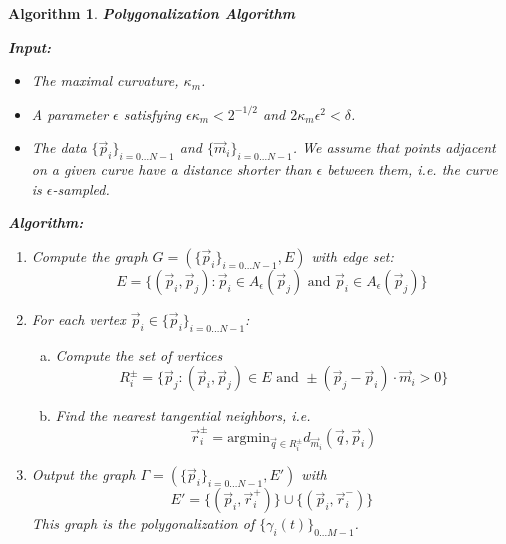 \documentclass{article}
\newtheorem{algo}{Algorithm}
\numberwithin{cntr}{section}
\numberwithin{equation}{section}
\newcommand{\vp}[0]{{\vec{p}}}
\newcommand{\vq}[0]{{\vec{q}}}
\newcommand{\vr}[0]{{\vec{r}}}
\newcommand{\vm}[0]{{\vec{m}}}
\newcommand{\Oto}[1]{{0 \ldots #1-1}}
\newcommand{\OtoN}{{0 \ldots N-1}}
\newcommand{\pointData}{{ \{ \vp_{i} \}_{i=\OtoN} }}
\newcommand{\tanData}{{ \{ \vm_{i} \}_{i=\OtoN} }}
\newcommand{\curveSet}{{ \{ \gamma_i(t) \}_{\Oto{M}}}}
\newcommand{\allowed}[2]{ { A_{#1}(#2) } }
\newcommand{\curvemax}{{\kappa_{m}}}
\newcommand{\curvesep}{{\delta}}
\begin{document}
\begin{algo}
  \label{algo:polygonalization}
  {\bf Polygonalization Algorithm }

  { \bf Input: }

  \begin{itemize}
  \item The maximal curvature, $\curvemax$.
  \item A parameter $\epsilon$ satisfying $\epsilon \curvemax < 2^{-1/2}$ and $2 \curvemax \epsilon^{2} < \curvesep$.
  \item The data $\pointData$ and $\tanData$. We assume that points adjacent on a given curve have a distance shorter than $\epsilon$ between them, i.e. the curve is $\epsilon$-sampled.
  \end{itemize}


  {\bf Algorithm: }

  \begin{enumerate}
  \item Compute the graph $G = (\pointData, E)$ with edge set:
    \begin{equation*}
      E = \{ (\vp_{i},\vp_{j}) : \vp_{i} \in \allowed{\epsilon}{\vp_{j}} \textrm{~and~} \vp_{i} \in \allowed{\epsilon}{\vp_{j}}\}
    \end{equation*}
  \item For each vertex $\vp_{i} \in \pointData$:
    \begin{enumerate}[a.]
    \item Compute the set of vertices
      \begin{equation*}
        R^{\pm}_{i} = \{ \vp_{j} : (\vp_{i}, \vp_{j}) \in E \textrm{~and~} \pm (\vp_{j}-\vp_{i}) \cdot \vm_{i} > 0 \}
      \end{equation*}
    \item Find the nearest tangential neighbors, i.e.
      \begin{equation*}
        \vr^{\pm}_{i} = \textrm{argmin}_{\vq \in R^{\pm}_{i}} d_{\vm_{i}}(\vq, \vp_{i})
      \end{equation*}
    \end{enumerate}
  \item Output the graph $\Gamma = ( \pointData, E')$ with
    \begin{equation*}
      E' = \{ (\vp_{i}, \vr^{+}_{i}) \} \cup \{ (\vp_{i}, \vr^{-}_{i}) \}
    \end{equation*}
    This graph is the polygonalization of $\curveSet$.
  \end{enumerate}

\end{algo}
\end{document}
